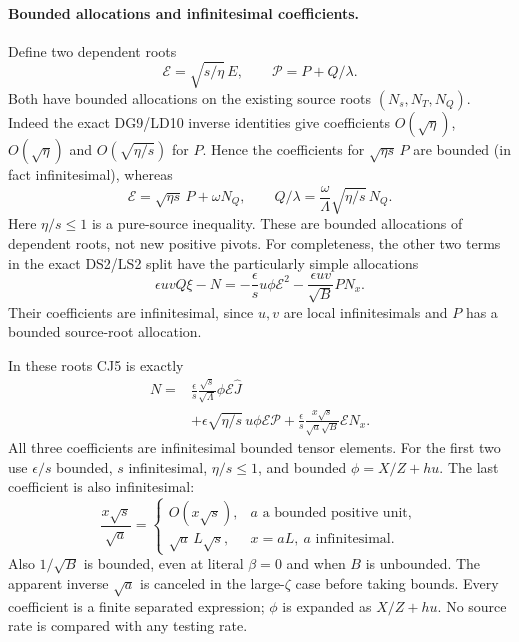 \paragraph{Bounded allocations and infinitesimal coefficients.}
Define two dependent roots
\[
 \mathcal E=\sqrt{s/\eta}\,E,
 \qquad \mathcal P=P+Q/\lambda.
\]
Both have bounded allocations on the existing source roots
$(N_s,N_T,N_Q)$.  Indeed the exact DG9/LD10 inverse identities give
coefficients $O(\sqrt\eta)$, $O(\sqrt\eta)$ and
$O(\sqrt{\eta/s})$ for $P$.  Hence the coefficients for
$\sqrt{\eta s}\,P$ are bounded (in fact infinitesimal), whereas
\[
 \mathcal E=\sqrt{\eta s}\,P+\omega N_Q,
 \qquad
 Q/\lambda=\frac{\omega}{\Lambda}\sqrt{\eta/s}\,N_Q.
                                                               \tag{CJ6}
\]
Here $\eta/s\le1$ is a pure-source inequality.  These are bounded
allocations of dependent roots, not new positive pivots.
For completeness, the other two terms in the exact DS2/LS2 split
have the particularly simple allocations
\[
 \epsilon uvQ\xi-N
   =-\frac{\epsilon}{s}u\phi\mathcal E^2
     -\frac{\epsilon uv}{\sqrt B}PN_x.               \tag{CJ6a}
\]
Their coefficients are infinitesimal, since $u,v$ are local
infinitesimals and $P$ has a bounded source-root allocation.

In these roots CJ5 is exactly
\[
\begin{split}
 N={}&\frac{\epsilon}{s}\frac{\sqrt s}{\sqrt\Lambda}
                  \phi\mathcal E\widehat J\\
 &+\epsilon\sqrt{\eta/s}\,u\phi\mathcal E\mathcal P
   +\frac{\epsilon}{s}
       \frac{x\sqrt s}{\sqrt a\sqrt B}\mathcal E N_x .
\end{split}                                                    \tag{CJ7}
\]
All three coefficients are infinitesimal bounded tensor elements.
For the first two use $\epsilon/s$ bounded, $s$ infinitesimal,
$\eta/s\le1$, and bounded
$\phi=X/Z+hu$.  The last coefficient is also infinitesimal:
\[
 \frac{x\sqrt s}{\sqrt a}=
 \begin{cases}
 O(x\sqrt s),&a\text{ a bounded positive unit},\\
 \sqrt a\,L\sqrt s,&x=aL,\ a\text{ infinitesimal}.
 \end{cases}                                                   \tag{CJ8}
\]
Also $1/\sqrt B$ is bounded, even at literal $\beta=0$ and when
$B$ is unbounded.  The apparent inverse $\sqrt a$ is canceled in
the large-$\zeta$ case before taking bounds.  Every coefficient is
a finite separated expression; $\phi$ is expanded as $X/Z+hu$.
No source rate is compared with any testing rate.

